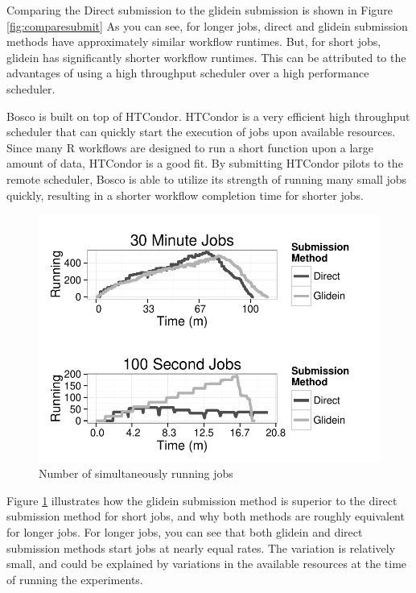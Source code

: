 Comparing the Direct submission to the glidein submission is shown in Figure \ref{fig:comparesubmit}  As you can see, for longer jobs, direct and glidein submission methods have approximately similar workflow runtimes.  But, for short jobs, glidein has significantly shorter workflow runtimes.  This can be attributed to the advantages of using a high throughput scheduler over a high performance scheduler.

Bosco is built on top of HTCondor.  HTCondor is a very efficient high throughput scheduler that can quickly start the execution of jobs upon available resources.  Since many R workflows are designed to run a short function upon a large amount of data, HTCondor is a good fit.  By submitting HTCondor pilots to the remote scheduler, Bosco is able to utilize its strength of running many small jobs quickly, resulting in a shorter workflow completion time for shorter jobs.

\begin{figure}[ht!]
\centering
\includegraphics[width=\textwidth]{BoscoRImages/NumberRunning.pdf}

\caption{Number of simultaneously running jobs}
\label{fig:runningjobs}
\end{figure}

Figure \ref{fig:runningjobs} illustrates how the glidein submission method is superior to the direct submission method for short jobs, and why both methods are roughly equivalent for longer jobs.  For longer jobs, you can see that both glidein and direct submission methods start jobs at nearly equal rates.  The variation is relatively small, and could be explained by variations in the available resources at the time of running the experiments. 

